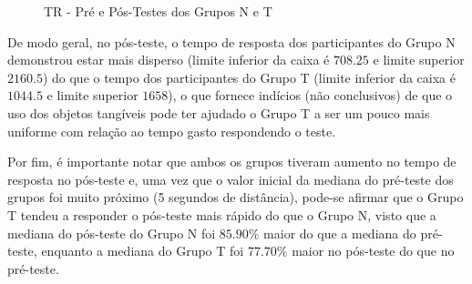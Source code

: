 \begin{figure}[htb]
	\centering
	\captionsetup{justification=centering}
	\caption{TR - Pré e Pós-Testes dos Grupos N e T}
	\label{fig:F1_TR_H02}
\end{figure}

De modo geral, no pós-teste, o tempo de resposta dos participantes do Grupo N demonstrou estar mais disperso (limite inferior da caixa é $708.25$ e limite superior $2160.5$) do que o tempo dos participantes do Grupo T (limite inferior da caixa é $1044.5$ e limite superior $1658$), o que fornece indícios (não conclusivos) de que o uso dos objetos tangíveis pode ter ajudado o Grupo T a ser um pouco mais uniforme com relação ao tempo gasto respondendo o teste.

Por fim, é importante notar que ambos os grupos tiveram aumento no tempo de resposta no pós-teste e, uma vez que o valor inicial da mediana do pré-teste dos grupos foi muito próximo (5 segundos de distância), pode-se afirmar que o Grupo T tendeu a responder o pós-teste mais rápido do que o Grupo N, visto que a mediana do pós-teste do Grupo N foi $85.90\%$ maior do que a mediana do pré-teste, enquanto a mediana do Grupo T foi $77.70\%$ maior no pós-teste do que no pré-teste.

